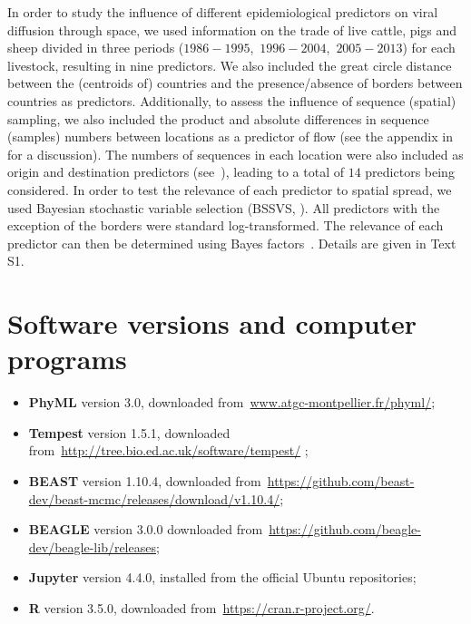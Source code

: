 \documentclass[10pt]{article}
\begin{document}
In order to study the influence of different epidemiological predictors on viral diffusion through space, we used information on the trade of live cattle, pigs and sheep divided in three periods ($1986-1995$,~$1996-2004$,~$2005-2013$) for each livestock, resulting in nine predictors. %
We also included the great circle distance between the (centroids of) countries and the presence/absence of borders between countries as predictors.
Additionally, to assess the influence of sequence (spatial) sampling, we also included the product and absolute differences in sequence (samples) numbers between locations as a predictor of flow (see the appendix in~\cite{Lemey2014} for a discussion).
The numbers of sequences in each location were also included as origin and destination predictors (see~\cite{Dudas2017}), leading to a total of $14$ predictors being considered.
In order to test the relevance of each predictor to spatial spread, we used Bayesian stochastic variable selection (BSSVS, \cite{Lemey2009}).
All predictors with the exception of the borders were standard log-transformed. %
The relevance of each predictor can then be determined using Bayes factors~\citep{KassRaftery1995,Lemey2009,Lemey2014}.
Details are given in Text S1.

\section*{Software versions and computer programs}

\begin{itemize}
 \item \textbf{PhyML} version 3.0, downloaded from~\url{www.atgc-montpellier.fr/phyml/};
 \item \textbf{Tempest} version 1.5.1, downloaded from~\url{http://tree.bio.ed.ac.uk/software/tempest/}  ;
 \item \textbf{BEAST} version 1.10.4, downloaded from~\url{https://github.com/beast-dev/beast-mcmc/releases/download/v1.10.4/};
 \item \textbf{BEAGLE} version 3.0.0 downloaded from~\url{https://github.com/beagle-dev/beagle-lib/releases};
 \item  \textbf{Jupyter} version 4.4.0, installed from the official Ubuntu repositories;
 \item \textbf{R} version 3.5.0, downloaded from~\url{https://cran.r-project.org/}.
\end{itemize}
\end{document}
